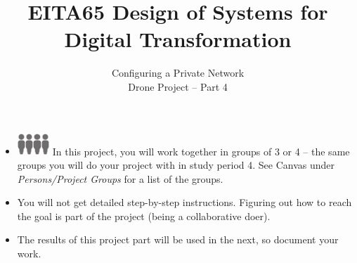 \documentclass{article}
\title{EITA65 Design of Systems for Digital Transformation\\\year}
\author{\huge Configuring a Private Network\\Drone Project -- Part 4}
\begin{document}
\clearpage\maketitle
\thispagestyle{empty}%

\begin{itemize}
\item \includegraphics[width=3mm]{person.png}\includegraphics[width=3mm]{person.png}\includegraphics[width=3mm]{person.png}\includegraphics[width=3mm]{person.png} In this project, you will work together in groups  of 3 or 4 -- the same groups you will do your project with in study period 4. See Canvas under \emph{Persons/Project Groups} for a list of the groups.
\item You will not get detailed step-by-step instructions. Figuring out how to reach the goal is part of the project (being a collaborative doer).
\item The results of this project part will be used in the next, so document your work.
\end{itemize}
\end{document}
